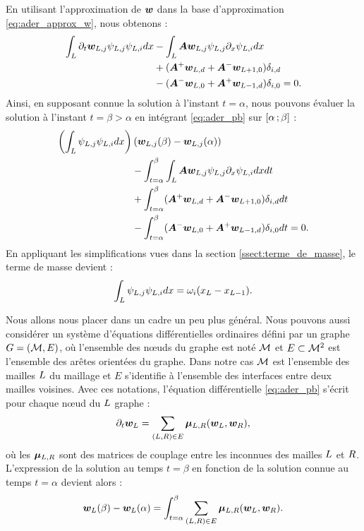 En utilisant l'approximation de $\bm{w}$ dans la base d'approximation
\eqref{eq:ader_approx_w}, nous obtenons :
\begin{equation}
	\begin{aligned}
		\int_{L} \partial_{t} \bm{w}_{L,j} \psi_{L,j} \psi_{L,i} dx
		&- \int_{L} \bm{A} \bm{w}_{L,j} \psi_{L,j} \partial_{x} \psi_{L,i} dx \\
		&+ (\bm{A}^{+} \bm{w}_{L,d} +
		\bm{A}^{-} \bm{w}_{L+1,0}) \delta_{i,d}  \\
		&- (\bm{A}^{-} \bm{w}_{L,0} +
		\bm{A}^{+} \bm{w}_{L-1,d}) \delta_{i,0} = 0
		\label{eq:ader_pb} .
	\end{aligned}
\end{equation}
Ainsi, en supposant connue la solution à l'instant $t = \alpha$, nous pouvons
évaluer la solution à l'instant $t = \beta > \alpha$ en intégrant
\eqref{eq:ader_pb} sur $\lbrack\alpha\,;\beta\rbrack$ :
\begin{equation}
	\begin{aligned}
		\left( \int_{L} \psi_{L,j} \psi_{L,i} dx \right)
		&\left( \bm{w}_{L,j}(\beta) - \bm{w}_{L,j}(\alpha) \right) \\
		&- \int_{t=\alpha}^{\beta} \int_{L} \bm{A} \bm{w}_{L,j} \psi_{L,j} \partial_{x} \psi_{L,i} dx dt \\
		&+ \int_{t=\alpha}^{\beta} (\bm{A}^{+} \bm{w}_{L,d} +
		\bm{A}^{-} \bm{w}_{L+1,0}) \delta_{i,d} dt \\
		&- \int_{t=\alpha}^{\beta} (\bm{A}^{-} \bm{w}_{L,0} +
		\bm{A}^{+} \bm{w}_{L-1,d}) \delta_{i,0} dt = 0
		\label{eq:ader_pb_int_t} .
	\end{aligned}
\end{equation}
En appliquant les simplifications vues dans la section
\ref{ssect:terme_de_masse}, le terme de masse devient :
\begin{align}
	\int_{L} \psi_{L,j} \psi_{L,i} dx
	= \omega_{i} (x_{L} - x_{L - 1}) .
\end{align}

Nous allons nous placer dans un cadre un peu plus général. Nous pouvons aussi considérer
 un système d'équations différentielles
ordinaires défini par un graphe $G=(\mathcal{M},E)$, où l'ensemble des nœuds du graphe est noté $\mathcal{M}$ 
et $E \subset \mathcal{M}^2$ est l'ensemble des arêtes orientées du graphe. Dans notre cas $\mathcal{M}$ est 
l'ensemble des mailles $L$ du maillage et $E$ s'identifie à l'ensemble des interfaces entre deux mailles
voisines.
Avec ces notations, l'équation différentielle \eqref{eq:ader_pb} s'écrit pour chaque nœud du
$L$ graphe :
\begin{align} \label{eq:ader_sys_gd}
	\partial_{t} \bm{w}_L = \sum_{(L,R) \in E}
		\bm{\mu}_{L,R} (\bm{w}_L, \bm{w}_R) ,
\end{align}
où les $\bm{\mu}_{L,R}$ sont des matrices de couplage entre les inconnues des mailles $L$ et $R$.
L'expression de la solution au temps $t = \beta$ en fonction
de la solution connue au temps $t = \alpha$ devient alors :
\begin{align}
	\bm{w}_L(\beta) - \bm{w}_L(\alpha) =
	\int_{t=\alpha}^{\beta} \sum_{(L,R) \in E}
	\bm{\mu}_{L,R} (\bm{w}_L, \bm{w}_R)
	\label{eq:ader_sys_gd_int_t} .
\end{align}


